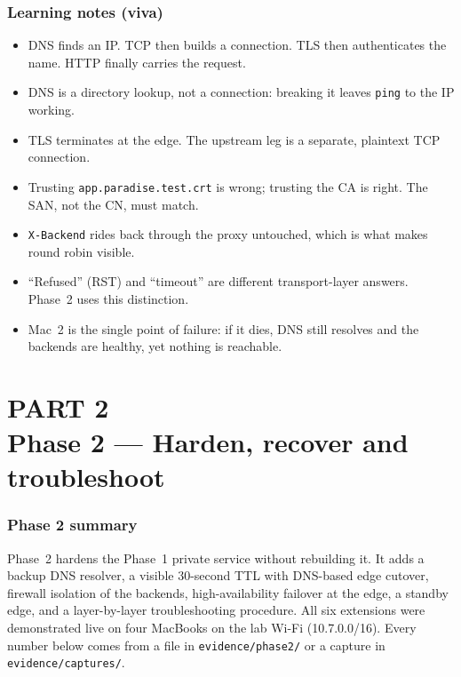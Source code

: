 \documentclass[11pt,a4paper]{article}
\begin{document}
\section{Learning notes (viva)}
\begin{itemize}
  \item DNS finds an IP. TCP then builds a connection. TLS then authenticates the name. HTTP finally carries the request.
  \item DNS is a directory lookup, not a connection: breaking it leaves \texttt{ping} to the IP working.
  \item TLS terminates at the edge. The upstream leg is a separate, plaintext TCP connection.
  \item Trusting \texttt{app.paradise.test.crt} is wrong; trusting the CA is right. The SAN, not the CN, must match.
  \item \texttt{X-Backend} rides back through the proxy untouched, which is what makes round robin visible.
  \item ``Refused'' (RST) and ``timeout'' are different transport-layer answers. Phase~2 uses this distinction.
  \item Mac~2 is the single point of failure: if it dies, DNS still resolves and the backends are healthy, yet nothing is reachable.
\end{itemize}

\clearpage
\part*{{\large\color{lmTeal}PART 2}\protect\\[6pt]Phase 2 --- Harden, recover and troubleshoot}
\section{Phase 2 summary}
Phase~2 hardens the Phase~1 private service without rebuilding it. It adds a backup DNS
resolver, a visible 30-second TTL with DNS-based edge cutover, firewall isolation of the
backends, high-availability failover at the edge, a standby edge, and a layer-by-layer
troubleshooting procedure. All six extensions were demonstrated live on four MacBooks on the
lab Wi-Fi (10.7.0.0/16). Every number below comes from a file in \texttt{evidence/phase2/} or a
capture in \texttt{evidence/captures/}.
\end{document}
